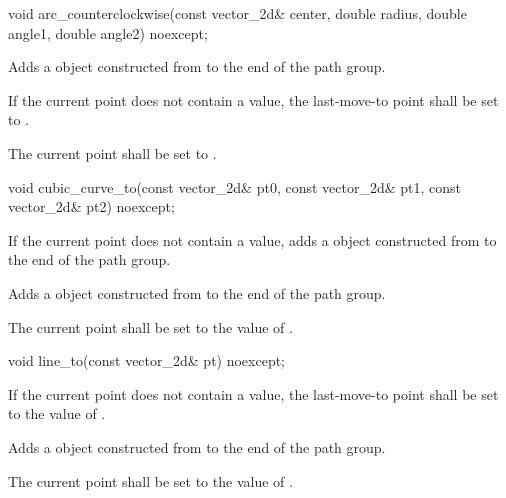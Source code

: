 \begin{itemdecl}
    void arc_counterclockwise(const vector_2d& center, double radius,
      double angle1, double angle2) noexcept;
\end{itemdecl}
\begin{itemdescr}
	\pnum
	\effects
	Adds a  object constructed from  to the end of the path group.
	
	\pnum
	If the current point does not contain a value, the last-move-to point shall be set to .
	
	\pnum
	The current point shall be set to .
\end{itemdescr}

\begin{itemdecl}
    void cubic_curve_to(const vector_2d& pt0, const vector_2d& pt1,
      const vector_2d& pt2) noexcept;
\end{itemdecl}
\begin{itemdescr}
	\pnum
	\effects
	If the current point does not contain a value, adds a  object constructed from  to the end of the path group.
	
	\pnum
	Adds a  object constructed from  to the end of the path group.
	
	\pnum
	The current point shall be set to the value of .
\end{itemdescr}

\begin{itemdecl}
    void line_to(const vector_2d& pt) noexcept;
\end{itemdecl}
\begin{itemdescr}
	\pnum
	\effects
	If the current point does not contain a value, the last-move-to point shall be set to the value of .
	
	\pnum
	Adds a  object constructed from  to the end of the path group.
	
	\pnum
	The current point shall be set to the value of .
\end{itemdescr}

